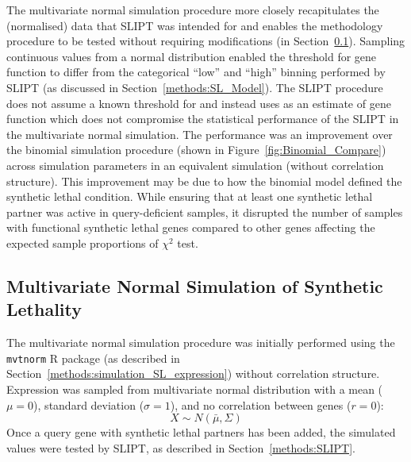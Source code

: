 The multivariate normal simulation procedure more closely recapitulates the (normalised)  data that \gls{SLIPT} was intended for and enables the methodology procedure to be tested without requiring modifications (in Section~\ref{chapt2:simulation_mvtnorm}). Sampling continuous  values from a normal distribution enabled the  threshold for gene function to differ from the categorical ``low'' and ``high''  binning performed by \gls{SLIPT} (as discussed in Section~\ref{methods:SL_Model}). The \gls{SLIPT} procedure does not assume a known threshold for  and instead uses  as an estimate of gene function which does not compromise the statistical performance of the \gls{SLIPT} in the multivariate normal simulation. The performance was an improvement over the binomial simulation procedure (shown in Figure~\ref{fig:Binomial_Compare}) across simulation parameters in an equivalent simulation (without correlation structure). This improvement may be due to how the binomial model defined the \gls{synthetic lethal} condition. While ensuring that at least one \gls{synthetic lethal} partner was active in query-deficient samples, it disrupted the number of samples with functional \gls{synthetic lethal} genes compared to other genes affecting the expected sample proportions of $\chi^2$ test.

\FloatBarrier

\subsection{Multivariate Normal Simulation of Synthetic Lethality} \label{chapt2:simulation_mvtnorm}

The multivariate normal simulation procedure was initially performed using the \texttt{mvtnorm} R package \citep{Genz2009, mvtnorm} (as described in Section~\ref{methods:simulation_SL_expression}) without correlation structure. Expression was sampled from multivariate normal distribution with a mean ($\mu = 0$), standard deviation ($\sigma = 1$), and no correlation between genes ($r = 0$): $$X\sim N(\bar{\mu},\Sigma)$$  Once a query gene with \gls{synthetic lethal} partners has been added, the simulated  values were tested by \gls{SLIPT}, as described in Section~\ref{methods:SLIPT}.


